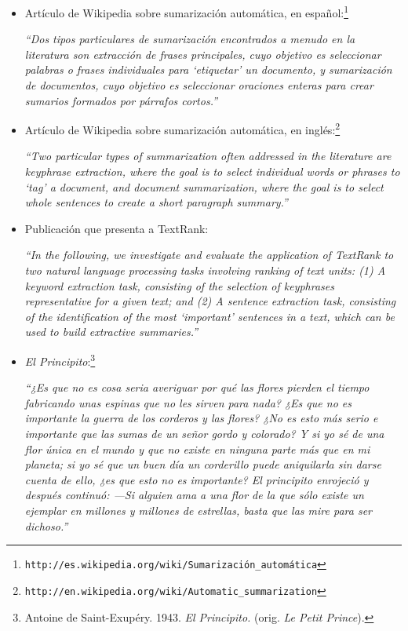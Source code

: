 \documentclass[12pt,a4paper]{article}
\begin{document}
\begin{itemize}
    \item Artículo de Wikipedia sobre sumarización automática, en español:\footnote{\texttt{http://es.wikipedia.org/wiki/Sumarización\_automática}}

\emph{``Dos tipos particulares de sumarización encontrados a menudo en la literatura son extracción de frases principales, cuyo objetivo es seleccionar palabras o frases individuales para `etiquetar' un documento, y sumarización de documentos, cuyo objetivo es seleccionar oraciones enteras para crear sumarios formados por párrafos cortos.''}

    \item Artículo de Wikipedia sobre sumarización automática, en inglés:\footnote{\texttt{http://en.wikipedia.org/wiki/Automatic\_summarization}}

\emph{``Two particular types of summarization often addressed in the literature are keyphrase extraction, where the goal is to select individual words or phrases to `tag' a document, and document summarization, where the goal is to select whole sentences to create a short paragraph summary.''}

    \item Publicación que presenta a TextRank:

\emph{``In the following, we investigate and evaluate the application of \mbox{TextRank} to two natural language processing tasks involving ranking of text units: (1) A keyword extraction task, consisting of the selection of keyphrases representative for a given text; and (2) A sentence extraction task, consisting of the identification of the most `important' sentences in a text, which can be used to build extractive summaries.''}

    \item \textit{El Principito}:\footnote{Antoine de Saint-Exupéry. 1943. \textit{El Principito.} (orig. \textit{Le Petit Prince}).}

\emph{``¿Es que no es cosa seria averiguar por qué las flores pierden el tiempo fabricando unas espinas que no les sirven para nada? ¿Es que no es importante la guerra de los corderos y las flores? ¿No es esto más serio e importante que las sumas de un señor gordo y colorado? Y si yo sé de una flor única en el mundo y que no existe en ninguna parte más que en mi planeta; si yo sé que un buen día un corderillo puede aniquilarla sin darse cuenta de ello, ¿es que esto no es importante? El principito enrojeció y después continuó: ---Si alguien ama a una flor de la que sólo existe un ejemplar en millones y millones de estrellas, basta que las mire para ser dichoso.''}

\end{itemize}
\end{document}
